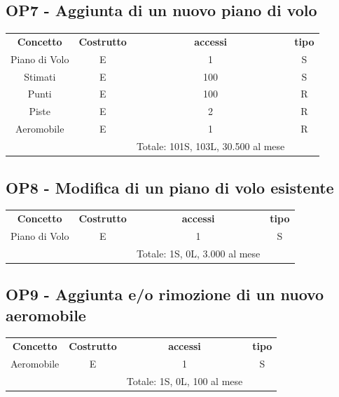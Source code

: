     \subsection*{OP7 - Aggiunta di un nuovo piano di volo}
    \begin{table}[H]
    \centering
    \begin{tabular}{cccc}
  
    \rowcolor{tableheadercolor}
    \textbf{Concetto} & \textbf{Costrutto} & \textbf{accessi} & \textbf{tipo}\\
  
    Piano di Volo & E & 1 & S \\
    Stimati & E & 100 & S \\
    Punti & E & 100 & R \\
    Piste & E & 2 & R \\
    Aeromobile & E & 1 & R \\
    & & Totale: 101S, 103L, 30.500 al mese &\\
  
    \end{tabular}
    \end{table}
  
    \subsection*{OP8 - Modifica di un piano di volo esistente}
    \begin{table}[H]
    \centering
    \begin{tabular}{cccc}
  
    \rowcolor{tableheadercolor}
    \textbf{Concetto} & \textbf{Costrutto} & \textbf{accessi} & \textbf{tipo}\\
  
    Piano di Volo & E & 1 & S \\\
    & & Totale: 1S, 0L, 3.000 al mese &\\
  
    \end{tabular}
    \end{table}

    \subsection*{OP9 - Aggiunta e/o rimozione di un nuovo aeromobile}
    \begin{table}[H]
    \centering
    \begin{tabular}{cccc}
  
    \rowcolor{tableheadercolor}
    \textbf{Concetto} & \textbf{Costrutto} & \textbf{accessi} & \textbf{tipo}\\
  
    Aeromobile & E & 1 & S \\\
    & & Totale: 1S, 0L, 100 al mese &\\
  
    \end{tabular}
    \end{table}

